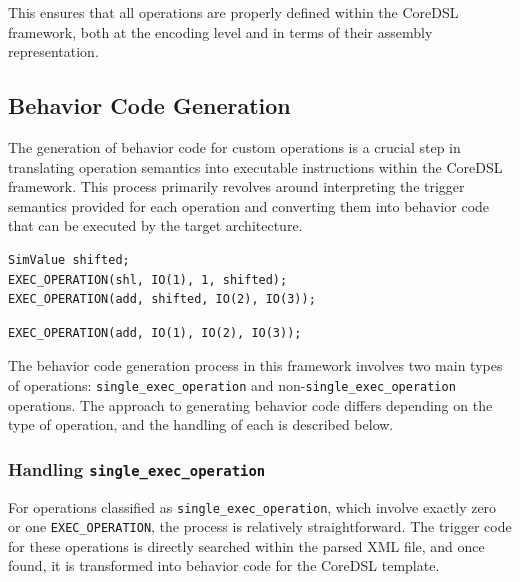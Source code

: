 This ensures that all operations are properly defined within the CoreDSL framework, both at the encoding level and in terms of their assembly representation.

\subsection{Behavior Code Generation}

The generation of behavior code for custom operations is a crucial step in translating operation semantics into executable instructions within the CoreDSL framework. This process primarily revolves around interpreting the trigger semantics provided for each operation and converting them into behavior code that can be executed by the target architecture.

\begin{lstlisting}[caption={Non-Single Exec Operation Semantics Example},captionpos=b]
SimValue shifted;
EXEC_OPERATION(shl, IO(1), 1, shifted);
EXEC_OPERATION(add, shifted, IO(2), IO(3));
\end{lstlisting}
\begin{lstlisting}[caption={Single Exec Operation Semantics Example},captionpos=b]
EXEC_OPERATION(add, IO(1), IO(2), IO(3));
\end{lstlisting}

The behavior code generation process in this framework involves two main types of operations: \texttt{single\_exec\_operation} and non-\texttt{single\_exec\_operation} operations. The approach to generating behavior code differs depending on the type of operation, and the handling of each is described below.

\subsubsection{Handling \texttt{single\_exec\_operation}}

For operations classified as \texttt{single\_exec\_operation}, which involve exactly zero or one \texttt{EXEC\_OPERATION}, the process is relatively straightforward. The trigger code for these operations is directly searched within the parsed XML file, and once found, it is transformed into behavior code for the CoreDSL template.

